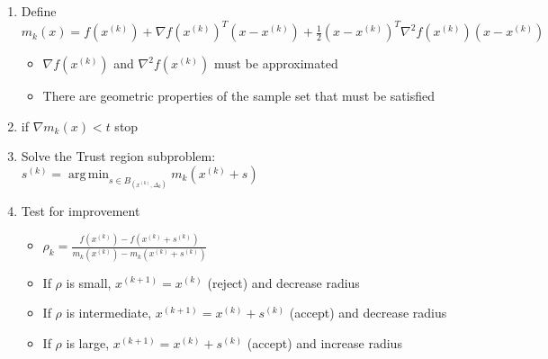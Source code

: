 \documentclass{article} %
\DeclareMathOperator*{\argmin}{arg\,min}
\begin{document}
\begin{enumerate}
	\item Define $m_k(x) = f(x^{(k)}) + \nabla f(x^{(k)})^T (x-x^{(k)}) + \frac 1 2 (x-x^{(k)})^T\nabla^2f(x^{(k)})(x-x^{(k)})$
	\begin{itemize}
		\item $\nabla f(x^{(k)})$ and $\nabla^2 f(x^{(k)})$ must be approximated
		\item There are geometric properties of the sample set that must be satisfied
	\end{itemize}
	\item if $\nabla m_k(x) < t$ stop
	\item Solve the Trust region subproblem: $s^{(k)} = \argmin_{s\in B_(x^{(k)}, \Delta_k)} m_k(x^{(k)} + s)$
	\item Test for improvement
	\begin{itemize}
		\item $\rho_k = \frac{f(x^{(k)}) - f(x^{(k)}+s^{(k)})}{m_k(x^{(k)}) - m_k(x^{(k)}+s^{(k)})}$
		\item If $\rho$ is small, $x^{(k+1)}=x^{(k)}$ (reject) and decrease radius
		\item If $\rho$ is intermediate, $x^{(k+1)}=x^{(k)}+s^{(k)}$ (accept) and decrease radius
		\item If $\rho$ is large, $x^{(k+1)}=x^{(k)}+s^{(k)}$ (accept) and increase radius
	\end{itemize}
\end{enumerate}










\end{document}
